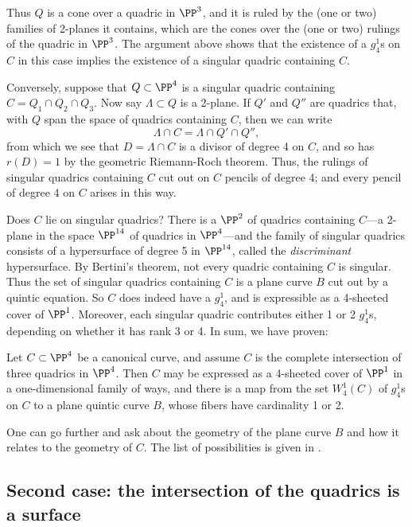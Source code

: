 Thus $Q$ is a cone over a quadric in $\PP^3$, and it is ruled by the (one or two) families of 2-planes it contains, which are the cones over the (one or two) rulings of the quadric in $\PP^3$. The argument above shows that the existence of a $g_4^1$s on $C$ in this case implies the existence of a singular quadric containing $C$.

Conversely, suppose that $Q \subset \PP^4$ is a singular quadric containing $C = Q_1 \cap Q_2 \cap Q_3$. Now say $\Lambda \subset Q$ is  a 2-plane. If $Q'$ and $Q''$ are quadrics that, with $Q$ span the
space of quadrics containing $C$, then we can write
$$
\Lambda \cap C = \Lambda \cap Q' \cap Q'', 
$$ 
from which we see that $D = \Lambda \cap C$ is a divisor of degree 4 on $C$, and so has $r(D) = 1$ by the geometric Riemann-Roch theorem. Thus, the rulings of  singular quadrics containing $C$ cut out on $C$ pencils of degree 4; and every pencil of degree 4 on $C$ arises in this way.

Does $C$ lie on singular quadrics? There is a $\PP^2$ of quadrics containing $C$---a 2-plane in the space $\PP^{14}$ of quadrics in $\PP^4$---and the family of singular quadrics  consists of a  hypersurface of degree 5 in $\PP^{14}$, called the \emph{discriminant} hypersurface. By Bertini's theorem, not every quadric containing $C$ is singular. Thus the set of singular quadrics containing $C$ is a plane curve $B$ cut out by a quintic equation. So $C$ does indeed have a $g^1_4$, and is expressible as a 4-sheeted cover of $\PP^1$. Moreover, each singular quadric contributes either 1 or 2 $g^1_4$s, depending on whether it has rank 3 or 4. In sum, we have proven:

\begin{proposition}
Let $C \subset \PP^4$ be a canonical curve, and assume $C$ is the complete intersection of three quadrics in $\PP^4$. Then $C$ may be expressed as a 4-sheeted cover of $\PP^1$ in a one-dimensional family of ways, and there is a map from the set $W^1_4(C)$ of $g^1_4$s on $C$ to a plane quintic curve $B$, whose fibers have cardinality 1 or 2.
\end{proposition}

One can go further and ask about the geometry of the plane curve $B$ and how it relates to the geometry of $C$. The list of possibilities is given in \cite[p. 274]{ACGH}. %

\subsection{Second case: the intersection of the quadrics is a surface}\label{trigonal genus 5}

